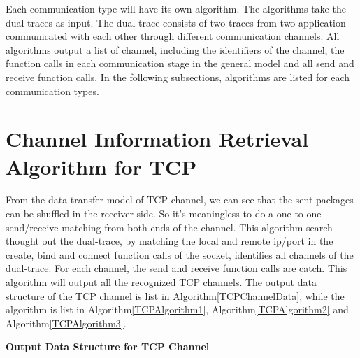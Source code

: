 \label{chapter:alo}
Each communication type will have its own algorithm. The algorithms take the dual-traces as input. The dual trace consists of two traces from two application communicated with each other through different communication channels. All algorithms output a list of channel, including the identifiers of the channel, the function calls in each communication stage in the general model and all send and receive function calls. In the following subsections, algorithms are listed for each communication types.

\section{Channel Information Retrieval Algorithm for TCP}
From the data transfer model of TCP channel, we can see that the sent packages can be shuffled in the receiver side. So it's meaningless to do a one-to-one send/receive matching from both ends of the channel. This algorithm search thought out the dual-trace, by matching the local and remote ip/port in the create, bind and connect function calls of the socket, identifies all channels of the dual-trace. For each channel, the send and receive function calls are catch. This algorithm will output all the recognized TCP channels. The output data structure of the TCP channel is list in Algorithm\ref{TCPChannelData}, while the algorithm is list in Algorithm\ref{TCPAlgorithm1}, Algorithm\ref{TCPAlgorithm2} and Algorithm\ref{TCPAlgorithm3}.

\begin{algorithm}[H]
\DontPrintSemicolon
\caption{{\bf Output Data Structure for TCP Channel} \label{TCPChannelData}}




\end{algorithm} 

